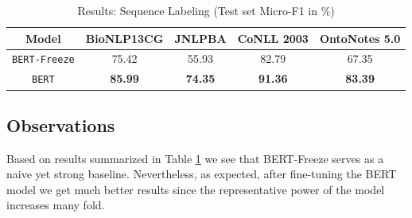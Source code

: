 
\begin{table}[h!]
\centering
\begin{tabular}{|c|c|c|c|c|}\hline
	\textbf{Model} & \textbf{BioNLP13CG} & \textbf{JNLPBA} & \textbf{CoNLL 2003} & \textbf{OntoNotes 5.0}\\\hline
	\texttt{BERT-Freeze} & 75.42 & 55.93 & 82.79 & 67.35 \\\hline
	\texttt{BERT} & \textbf{85.99} & \textbf{74.35} & \textbf{91.36} & \textbf{83.39} \\\hline
	\end{tabular}
    \caption{Results: Sequence Labeling (Test set Micro-F1 in \%)}
    \label{tab:res_seq_labeling}
\end{table}

\subsection{Observations}
Based on results summarized in Table \ref{tab:res_seq_labeling} we see that BERT-Freeze serves as a naive yet strong baseline. Nevertheless, as expected, after fine-tuning the BERT model we get much better results since the representative power of the model increases many fold.


